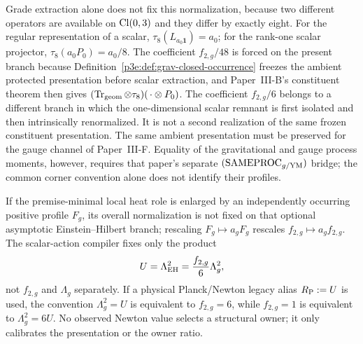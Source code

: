 \documentclass[12pt,a4paper]{article}
\begin{document}
\begin{remark}
\label{p3:rem:corner-trace-convention}
Grade extraction alone does not fix this normalization, because two different
operators are available on \(\operatorname{Cl}(0,3)\) and they differ by exactly eight.  For
the regular representation of a scalar, \(\tau_8(L_{a_0\mathbf 1})=a_0\);
for the rank-one scalar projector, \(\tau_8(a_0P_0)=a_0/8\).  The coefficient
\(f_{2,g}/48\) is forced on the present branch because
Definition~\ref{p3e:def:grav-closed-occurrence} freezes the ambient protected
presentation before scalar extraction, and Paper~III-B's constituent theorem
then gives
\((\operatorname{Tr}_{\rm geom}\otimes\tau_8)(\,\cdot\otimes P_0)\).
The coefficient \(f_{2,g}/6\) belongs to a different branch in which the
one-dimensional scalar remnant is first isolated and then intrinsically
renormalized.  It is not a second realization of the same frozen
constituent presentation.  The same ambient presentation must be preserved
for the gauge channel of Paper~III-F.  Equality of the gravitational and
gauge process moments, however, requires that paper's separate
\((\mathrm{SAMEPROC}_{g/{\rm YM}})\) bridge; the common corner convention
alone does not identify their profiles.
\end{remark}

\begin{remark}
If the premise-minimal local heat role is enlarged by an independently
occurring positive profile \(F_g\), its overall normalization is not fixed
on that optional asymptotic Einstein--Hilbert branch; rescaling
\(F_g\mapsto a_gF_g\) rescales
\(f_{2,g}\mapsto a_g f_{2,g}\).  The scalar-action compiler fixes only the product
\[
U=\Lambda_{\rm EH}^2=\frac{f_{2,g}}{6}\Lambda_g^2,
\]
not \(f_{2,g}\) and \(\Lambda_g\) separately.  If a physical Planck/Newton
legacy alias \(R_{\mathrm P}:=U\) is used, the convention \(\Lambda_g^2=U\) is
equivalent to \(f_{2,g}=6\), while \(f_{2,g}=1\) is equivalent to
\(\Lambda_g^2=6U\).  No observed Newton value selects a structural owner; it only calibrates the
presentation or the owner ratio.
\end{remark}
\end{document}
